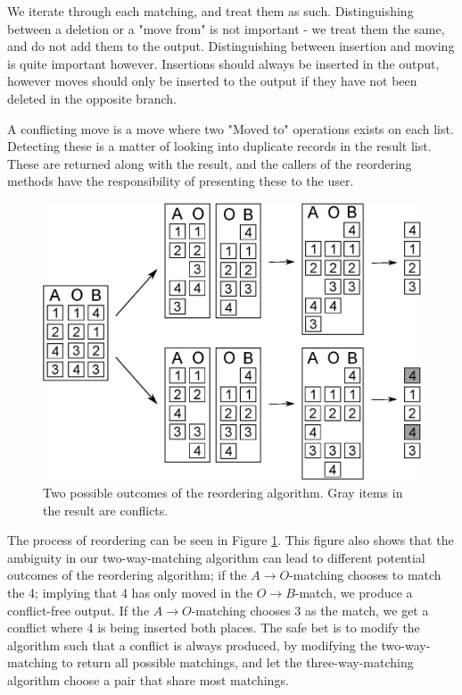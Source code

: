 \documentclass[11pt]{article}
\begin{document}
We iterate through each matching, and treat them as such. Distinguishing between a deletion or a "move from" is not important - we treat them the same, and do not add them to the output. Distinguishing between insertion and moving is quite important however. Insertions should always be inserted in the output, however moves should only be inserted to the output if they have not been deleted in the opposite branch. 

A conflicting move is a move where two "Moved to" operations exists on each list. Detecting these is a matter of looking into duplicate records in the result list. These are returned along with the result, and the callers of the reordering methods have the responsibility of presenting these to the user.

\begin{figure}
   \centerline{\includegraphics[scale=0.55]{drawings/eps/reordering.eps}}
   \caption{Two possible outcomes of the reordering algorithm. Gray items in the result are conflicts.}
   \label{Reordering}
\end{figure}

The process of reordering can be seen in Figure \ref{Reordering}. This figure also shows that the ambiguity in our two-way-matching algorithm can lead to different potential outcomes of the reordering algorithm; if the $A \rightarrow O$-matching chooses to match the 4; implying that 4 has only moved in the $O \rightarrow B$-match, we produce a conflict-free output. If the $A \rightarrow O$-matching chooses 3 as the match, we get a conflict where 4 is being inserted both places. The safe bet is to modify the algorithm such that a conflict is always produced, by modifying the two-way-matching to return all possible matchings, and let the three-way-matching algorithm choose a pair that share most matchings.
\end{document}
